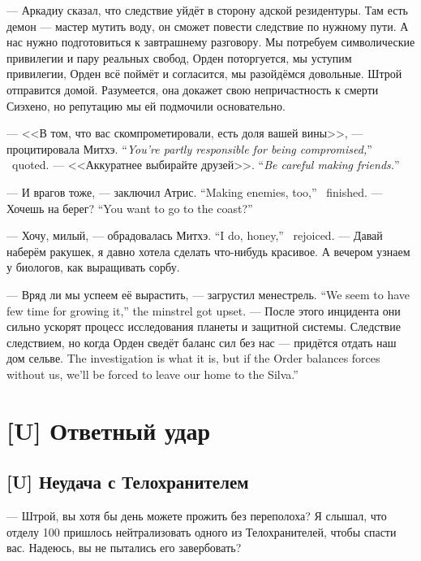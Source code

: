 --- Аркадиу сказал, что следствие уйдёт в сторону адской резидентуры.
Там есть демон --- мастер мутить воду, он сможет повести следствие по нужному пути.
А нас нужно подготовиться к завтрашнему разговору.
Мы потребуем символические привилегии и пару реальных свобод, Орден поторгуется, мы уступим привилегии, Орден всё поймёт и согласится, мы разойдёмся довольные.
Штрой отправится домой.
Разумеется, она докажет свою непричастность к смерти Сиэхено, но репутацию мы ей подмочили основательно.

{--- <<В том, что вас скомпрометировали, есть доля вашей вины>>, --- процитировала Митхэ.}
{``\emph{You're partly responsible for being compromised,}'' \Mitchoe\ quoted.}
{--- <<Аккуратнее выбирайте друзей>>.}
{``\emph{Be careful making friends.}''}

{--- И врагов тоже, --- заключил Атрис.}
{``Making enemies, too,'' \Aatris\ finished.}
{--- Хочешь на берег?}
{``You want to go to the coast?''}

{--- Хочу, милый, --- обрадовалась Митхэ.}
{``I do, honey,'' \Mitchoe\ rejoiced.}
--- Давай наберём ракушек, я давно хотела сделать что-нибудь красивое.
А вечером узнаем у биологов, как выращивать сорбу.

{--- Вряд ли мы успеем её вырастить, --- загрустил менестрель.}
{``We seem to have few time for growing it,'' the minstrel got upset.}
--- После этого инцидента они сильно ускорят процесс исследования планеты и защитной системы.
{Следствие следствием, но когда Орден сведёт баланс сил без нас --- придётся отдать наш дом сельве\FM.}
{The investigation is what it is, but if the Order balances forces without us, we'll be forced to leave our home to the Silva\FM.''}

\chapter{[U] Ответный удар}

\section{[U] Неудача с Телохранителем}

\textspace

--- Штрой, вы хотя бы день можете прожить без переполоха?
Я слышал, что отделу 100 пришлось нейтрализовать одного из Телохранителей, чтобы спасти вас.
Надеюсь, вы не пытались его завербовать?

